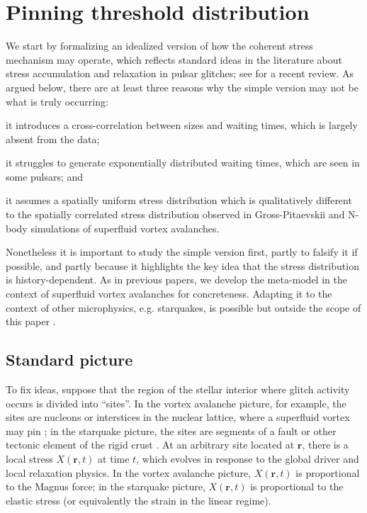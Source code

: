 \section{Pinning threshold distribution} \label{sec:hda_sec2}
We start by formalizing an idealized version of how the coherent stress mechanism may operate, which reflects standard ideas in the literature about stress accumulation and relaxation in pulsar glitches; see \citet{Haskell2015} for a recent review. As argued below, there are at least three reasons why the simple version may not be what is truly occurring: \begin{enumerate*}
\item it introduces a cross-correlation between sizes and waiting times, which is largely absent from the data;
\item it struggles to generate exponentially distributed waiting times, which are seen in some pulsars; and
\item it assumes a spatially uniform stress distribution which is qualitatively different to the spatially correlated stress distribution observed in Gross-Pitaevskii \citep{Warszawski2011, Lonnborn2019} and N-body simulations \citep{Howitt2020} of superfluid vortex avalanches.
\end{enumerate*}
Nonetheless it is important to study the simple version first, partly to falsify it if possible, and partly because it highlights the key idea that the stress distribution is history-dependent. As in previous papers, we develop the meta-model in the context of superfluid vortex avalanches for concreteness. Adapting it to the context of other microphysics, e.g. starquakes, is possible but outside the scope of this paper \citep{Newman1996}.

\subsection{Standard picture}
To fix ideas, suppose that the region of the stellar interior where glitch activity occurs is divided into ``sites''. In the vortex avalanche picture, for example, the sites are nucleons or interstices in the nuclear lattice, where a superfluid vortex may pin \citep{Jones1998, Donati2006, Avogadro2007}; in the starquake picture, the sites are segments of a fault or other tectonic element of the rigid crust \citep{Ruderman1998, Middleditch2006, Chugunov2010}. At an arbitrary site located at $\mathbf{r}$, there is a local stress $X(\mathbf{r}, t)$ at time $t$, which evolves in response to the global driver and local relaxation physics. In the vortex avalanche picture, $X(\mathbf{r}, t)$ is proportional to the Magnus force; in the starquake picture, $X(\mathbf{r}, t)$ is proportional to the elastic stress (or equivalently the strain in the linear regime). 

